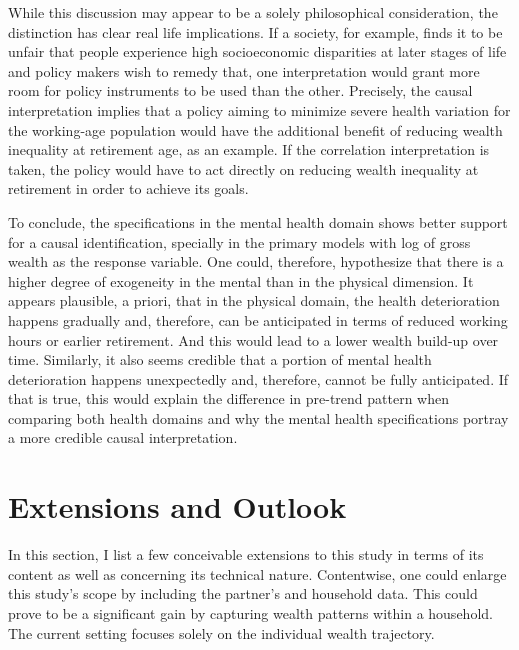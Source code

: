 While this discussion may appear to be a solely philosophical consideration, the distinction has clear real life
implications.  If a society, for example, finds it to be unfair that people experience high socioeconomic
disparities at later stages of life and policy makers wish to remedy that, one interpretation would grant more room
for policy instruments to be used than the other. Precisely, the causal interpretation implies that a policy aiming
to minimize severe health variation for the working-age population would have the additional benefit of reducing
wealth inequality at retirement age, as an example. If the correlation interpretation is taken, the policy would
have to act directly on reducing wealth inequality at retirement in order to achieve its goals.


To conclude, the specifications in the mental health domain shows better support for a causal identification,
specially in the primary models with log of gross wealth as the response variable.  One could, therefore,
hypothesize that there is a higher degree of exogeneity in the mental than in the physical dimension. It appears
plausible, a priori, that in the physical domain, the health deterioration happens gradually and, therefore, can be
anticipated in terms of reduced working hours or earlier retirement. And this would lead to a lower wealth build-up
over time. Similarly, it also seems credible that a portion of mental health deterioration happens unexpectedly
and, therefore, cannot be fully anticipated. If that is true, this would explain the difference in pre-trend
pattern when comparing both health domains and why the mental health specifications portray a more credible causal
interpretation.

\section{Extensions and Outlook}
\label{extensions}

In this section, I list a few conceivable extensions to this study in terms of its content as well as concerning
its technical nature. Contentwise, one could enlarge this study's scope by including the partner's and household
data. This could prove to be a significant gain by capturing wealth patterns within a household. The current
setting focuses solely on the individual wealth trajectory.


